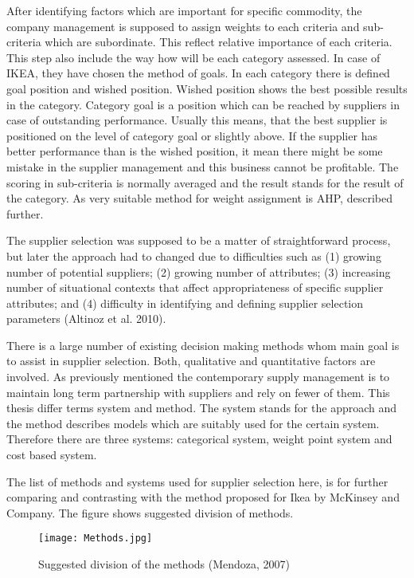 \documentclass[oneside,12pt]{article}%
\begin{document}
After identifying factors which are important for specific commodity, the company management is supposed to assign weights to each criteria and sub-criteria which are subordinate. This reflect relative importance of each criteria. This step also include the way how will be each category assessed. In case of IKEA, they have chosen the method of goals. In each category there is defined goal position and wished position. Wished position shows the best possible results in the category. Category goal is a position which can be reached by suppliers in case of outstanding performance. Usually this means, that the best supplier is positioned on the level of category goal or slightly above. If the supplier has better performance than is the wished position, it mean there might be some mistake in the supplier management and this business cannot be profitable. The scoring in sub-criteria is normally averaged and the result stands for the result of the category. As very suitable method for weight assignment is AHP, described further.


The supplier selection was supposed to be a matter of straightforward process, but later the approach had to changed due to difficulties such as (1) growing number of potential suppliers; (2) growing number of attributes; (3) increasing number of situational contexts that affect appropriateness of specific supplier attributes; and (4) difficulty in identifying and defining supplier selection parameters (Altinoz et al. 2010). \par
There is a large number of existing decision making methods whom main goal is to assist in supplier selection. Both, qualitative and quantitative factors are involved. As previously mentioned the contemporary supply management is to maintain long term partnership with suppliers and rely on fewer of them. This thesis differ terms system and method. The system stands for the approach and the method describes models which are suitably used for the certain system. Therefore there are three systems: categorical system, weight point system and cost based system. \par
The list of methods and systems used for supplier selection here, is for further comparing and contrasting with the method proposed for Ikea by McKinsey and Company. The figure shows suggested division of methods.



\begin{figure}[ht!]
  \texttt{[image: Methods.jpg]}
  \caption{Suggested division of the methods (Mendoza, 2007)}
\end{figure}
\end{document}
